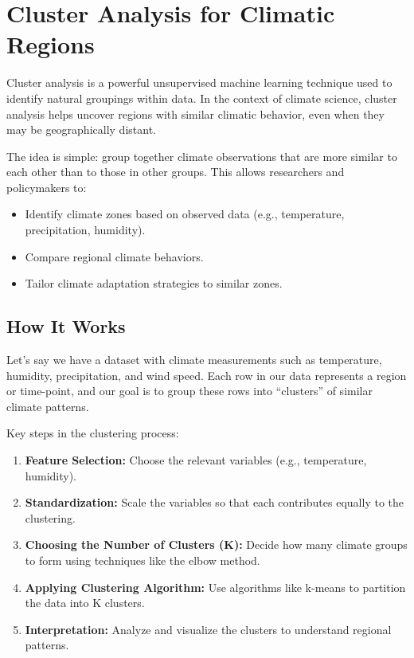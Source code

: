 \section{Cluster Analysis for Climatic Regions}

Cluster analysis is a powerful unsupervised machine learning technique used to identify natural groupings within data. In the context of climate science, cluster analysis helps uncover regions with similar climatic behavior, even when they may be geographically distant.

The idea is simple: group together climate observations that are more similar to each other than to those in other groups. This allows researchers and policymakers to:
\begin{itemize}
    \item Identify climate zones based on observed data (e.g., temperature, precipitation, humidity).
    \item Compare regional climate behaviors.
    \item Tailor climate adaptation strategies to similar zones.
\end{itemize}

\subsection*{How It Works}

Let’s say we have a dataset with climate measurements such as temperature, humidity, precipitation, and wind speed. Each row in our data represents a region or time-point, and our goal is to group these rows into “clusters” of similar climate patterns.

Key steps in the clustering process:
\begin{enumerate}
    \item \textbf{Feature Selection:} Choose the relevant variables (e.g., temperature, humidity).
    \item \textbf{Standardization:} Scale the variables so that each contributes equally to the clustering.
    \item \textbf{Choosing the Number of Clusters (K):} Decide how many climate groups to form using techniques like the elbow method.
    \item \textbf{Applying Clustering Algorithm:} Use algorithms like k-means to partition the data into K clusters.
    \item \textbf{Interpretation:} Analyze and visualize the clusters to understand regional patterns.
\end{enumerate}

